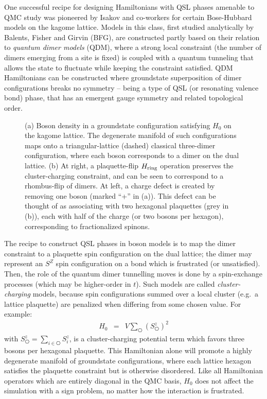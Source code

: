 \documentclass[range]{ar2e}
\begin{document}
One successful recipe for designing Hamiltonians with QSL phases amenable to QMC study was pioneered by Isakov and co-workers \cite{Isakov1, Isakov2, TopoEE} for certain Bose-Hubbard models on the kagome lattice.  Models in this class, first studied analytically by Balents, Fisher and Girvin\cite{BFG} (BFG),
are constructed partly based on their relation to {\it quantum dimer models} (QDM), where a strong local constraint (the number of dimers emerging from a site is fixed) is coupled with a quantum tunneling that allows the state to fluctuate while keeping the constraint satisfied.  QDM Hamiltonians can be constructed where groundstate superposition of dimer configurations breaks no symmetry -- being a type of QSL (or resonating valence bond) phase, that has an emergent gauge symmetry and related topological order.


\begin{figure}
  \caption{ (a) Boson density in a groundstate configuration satisfying $H_0$ on the kagome lattice.  The degenerate manifold of such configurations maps onto a triangular-lattice (dashed) classical three-dimer configuration, where each boson corresponds to a dimer on the dual lattice.  (b) At right, a plaquette-flip $H_{\rm ring}$ operation preserves the cluster-charging constraint, and can be seen to correspond to a rhombus-flip of dimers.  At left, a charge defect is created by removing one boson (marked ``+'' in (a)).  This defect can be thought of as associating with two hexagonal plaquettes (grey in (b)), each with half of the charge (or two bosons per hexagon), corresponding to fractionalized spinons.} \label{kag_fig}
\end{figure}

The recipe to construct QSL phases in boson models is to map the dimer constraint to a plaquette spin configuration on the dual lattice; the dimer may represent an $S^Z$ spin configuration on a bond which is frustrated (or unsatisfied).  Then, the role of the quantum dimer tunnelling moves is done by a spin-exchange processes (which may be higher-order in $t$).  Such models are called
{\it cluster-charging} models,\cite{Isakov2} because spin configurations summed over a local cluster (e.g.~a lattice plaquette) are penalized when differing from some chosen value.  For example:
\begin{eqnarray}
H_0 &=& V \sum_{\hexagon} (S^z_{\hexagon})^2 
\end{eqnarray}
with $S^z_{\hexagon} = \sum_{i \in \hexagon}S^z_i$,
is a cluster-charging potential term which favors three bosons per hexagonal plaquette.  This Hamiltonian alone will promote a highly degenerate manifold of groundstate configurations, where each lattice hexagon satisfies the plaquette constraint but is otherwise disordered.  
Like all Hamiltonian operators which are entirely diagonal in the QMC basis, $H_0$ does not affect the simulation with a sign problem, no matter how the interaction is frustrated.
\end{document}
